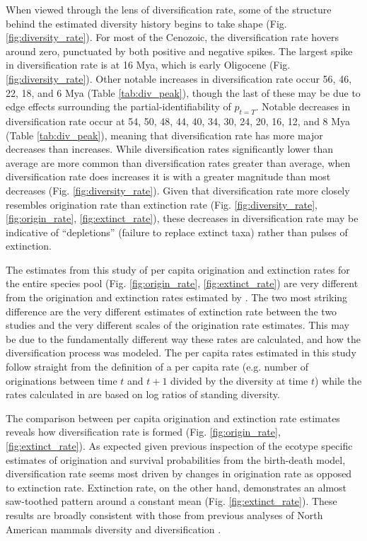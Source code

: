 \documentclass[12pt,letterpaper]{article}
\begin{document}
When viewed through the lens of diversification rate, some of the structure behind the estimated diversity history begins to take shape (Fig. \ref{fig:diversity_rate}). For most of the Cenozoic, the diversification rate hovers around zero, punctuated by both positive and negative spikes. The largest spike in diversification rate is at 16 Mya, which is early Oligocene (Fig. \ref{fig:diversity_rate}). Other notable increases in diversification rate occur 56, 46, 22, 18, and 6 Mya (Table \ref{tab:div_peak}), though the last of these may be due to edge effects surrounding the partial-identifiability of \(p_{t = T}\). Notable decreases in diversification rate occur at 54, 50, 48, 44, 40, 34, 30, 24, 20, 16, 12, and 8 Mya (Table \ref{tab:div_peak}), meaning that diversification rate has more major decreases than increases. While diversification rates significantly lower than average are more common than diversification rates greater than average, when diversification rate does increases it is with a greater magnitude than most decreases (Fig. \ref{fig:diversity_rate}). Given that diversification rate more closely resembles origination rate than extinction rate (Fig. \ref{fig:diversity_rate}, \ref{fig:origin_rate}, \ref{fig:extinct_rate}), these decreases in diversification rate may be indicative of ``depletions'' (failure to replace extinct taxa) rather than pulses of extinction. 

The estimates from this study of per capita origination and extinction rates for the entire species pool (Fig. \ref{fig:origin_rate}, \ref{fig:extinct_rate}) are very different from the origination and extinction rates estimated by \citet{Alroy2009}. The two most striking difference are the very different estimates of extinction rate between the two studies and the very different scales of the origination rate estimates. This may be due to the fundamentally different way these rates are calculated, and how the diversification process was modeled. The per capita rates estimated in this study follow straight from the definition of a per capita rate (e.g. number of originations between time \(t\) and \(t + 1\) divided by the diversity at time \(t\)) while the rates calculated in \citet{Alroy2009} are based on log ratios of standing diversity.

The comparison between per capita origination and extinction rate estimates reveals how diversification rate is formed (Fig. \ref{fig:origin_rate}, \ref{fig:extinct_rate}). As expected given previous inspection of the ecotype specific estimates of origination and survival probabilities from the birth-death model, diversification rate seems most driven by changes in origination rate as opposed to extinction rate. Extinction rate, on the other hand, demonstrates an almost saw-toothed pattern around a constant mean (Fig. \ref{fig:extinct_rate}). These results are broadly consistent with those from previous analyses of North American mammals diversity and diversification \citep{Alroy1996a,Alroy2000g,Alroy2009}.
\end{document}
